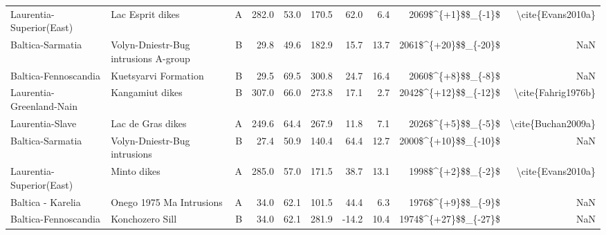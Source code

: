 \begin{longtable}{p{1 in}p{1 in}rrrrrrrr}
      Laurentia-Superior(East) &                                   Lac Esprit dikes &      A &     282.0 &      53.0 & 170.5 &  62.0 &       6.4 &     2069\$\textasciicircum \{+1\}\$\$\_\{-1\}\$ &                                  \textbackslash cite\{Evans2010a\} \\
              Baltica-Sarmatia &               Volyn-Dniestr-Bug intrusions A-group &      B &      29.8 &      49.6 & 182.9 &  15.7 &      13.7 &   2061\$\textasciicircum \{+20\}\$\$\_\{-20\}\$ &                                                NaN \\
          Baltica-Fennoscandia &                               Kuetsyarvi Formation &      B &      29.5 &      69.5 & 300.8 &  24.7 &      16.4 &     2060\$\textasciicircum \{+8\}\$\$\_\{-8\}\$ &                                                NaN \\
      Laurentia-Greenland-Nain &                                    Kangamiut dikes &      B &     307.0 &      66.0 & 273.8 &  17.1 &       2.7 &   2042\$\textasciicircum \{+12\}\$\$\_\{-12\}\$ &                                 \textbackslash cite\{Fahrig1976b\} \\
               Laurentia-Slave &                                  Lac de Gras dikes &      A &     249.6 &      64.4 & 267.9 &  11.8 &       7.1 &     2026\$\textasciicircum \{+5\}\$\$\_\{-5\}\$ &                                 \textbackslash cite\{Buchan2009a\} \\
              Baltica-Sarmatia &                       Volyn-Dniestr-Bug intrusions &      B &      27.4 &      50.9 & 140.4 &  64.4 &      12.7 &   2000\$\textasciicircum \{+10\}\$\$\_\{-10\}\$ &                                                NaN \\
      Laurentia-Superior(East) &                                        Minto dikes &      A &     285.0 &      57.0 & 171.5 &  38.7 &      13.1 &     1998\$\textasciicircum \{+2\}\$\$\_\{-2\}\$ &                                  \textbackslash cite\{Evans2010a\} \\
             Baltica - Karelia &                           Onego 1975 Ma Intrusions &      A &      34.0 &      62.1 & 101.5 &  44.4 &       6.3 &     1976\$\textasciicircum \{+9\}\$\$\_\{-9\}\$ &                                                NaN \\
          Baltica-Fennoscandia &                                    Konchozero Sill &      B &      34.0 &      62.1 & 281.9 & -14.2 &      10.4 &   1974\$\textasciicircum \{+27\}\$\$\_\{-27\}\$ &                                                NaN \\

\end{longtable}
